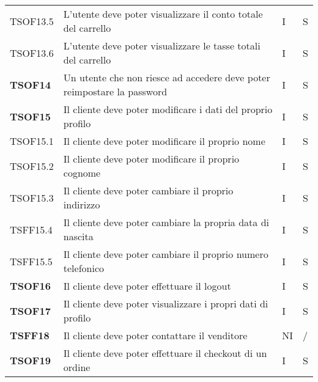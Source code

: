 \begin{center}
\begin{longtable}[!h]{p{60px} p{240px} p{35px} p{35px}}
        TSOF13.5        & L'utente deve poter visualizzare il conto totale del carrello                                       & I              & S              \\
        TSOF13.6        & L'utente deve poter visualizzare le tasse totali del carrello                                       & I              & S              \\
        \textbf{TSOF14} & Un utente che non riesce ad accedere deve poter reimpostare la password                             & I              & S              \\
        \textbf{TSOF15} & Il cliente deve poter modificare i dati del proprio profilo                                         & I              & S              \\
        TSOF15.1        & Il cliente deve poter modificare il proprio nome                                                    & I              & S              \\
        TSOF15.2        & Il cliente deve poter modificare il proprio cognome                                                 & I              & S              \\
        TSOF15.3        & Il cliente deve poter cambiare il proprio indirizzo                                                 & I              & S              \\
        TSFF15.4        & Il cliente deve poter cambiare la propria data di nascita                                           & I              & S              \\
        TSFF15.5        & Il cliente deve poter cambiare il proprio numero telefonico                                         & I              & S              \\
        \textbf{TSOF16} & Il cliente deve poter effettuare il logout                                                          & I              & S              \\
        \textbf{TSOF17} & Il cliente deve poter visualizzare i propri dati di profilo                                         & I              & S              \\
        \textbf{TSFF18} & Il cliente deve poter contattare il venditore                                                       & NI             & /              \\
        \textbf{TSOF19} & Il cliente deve poter effettuare il checkout di un ordine                                           & I              & S              \\

\end{longtable}
\end{center}
